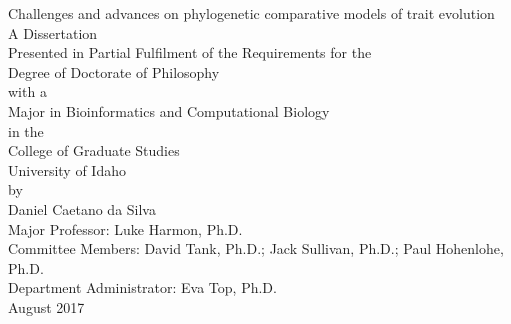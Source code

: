 \pagestyle{myheadings}

\thispagestyle{empty}

\begin{center}
Challenges and advances on phylogenetic comparative models of trait evolution\\
\vspace{48pt}
A Dissertation\\
Presented in Partial Fulfilment of the Requirements for the\\
Degree of Doctorate of Philosophy\\
with a\\
Major in Bioinformatics and Computational Biology\\
in the\\
College of Graduate Studies\\
University of Idaho\\
by\\
Daniel Caetano da Silva\\
\vspace{60pt}
Major Professor: Luke Harmon, Ph.D.\\
Committee Members: David Tank, Ph.D.; Jack Sullivan, Ph.D.; Paul Hohenlohe, Ph.D.\\
Department Administrator: Eva Top, Ph.D.\\
\vspace{80pt}
August 2017\\
\end{center}
\pagebreak

